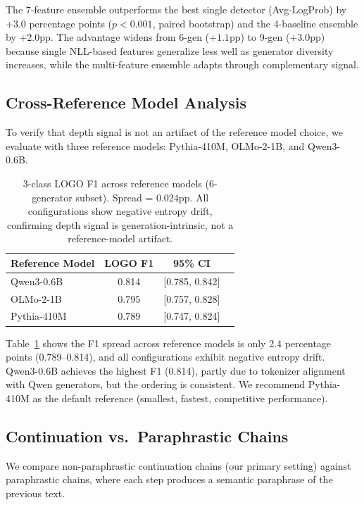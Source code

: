 \documentclass[11pt,a4paper]{article}
\begin{document}
The 7-feature ensemble outperforms the best single detector (Avg-LogProb) by +3.0 percentage points ($p < 0.001$, paired bootstrap) and the 4-baseline ensemble by +2.0pp. The advantage widens from 6-gen ($+1.1$pp) to 9-gen ($+3.0$pp) because single NLL-based features generalize less well as generator diversity increases, while the multi-feature ensemble adapts through complementary signal.

\subsection{Cross-Reference Model Analysis}
\label{sec:crossref}

To verify that depth signal is not an artifact of the reference model choice, we evaluate with three reference models: Pythia-410M, OLMo-2-1B, and Qwen3-0.6B.

\begin{table}[t]
\centering
\small
\begin{tabular}{lccc}
\toprule
\textbf{Reference Model} & \textbf{LOGO F1} & \textbf{95\% CI} \\
\midrule
Qwen3-0.6B    & 0.814 & [0.785, 0.842] \\
OLMo-2-1B     & 0.795 & [0.757, 0.828] \\
Pythia-410M    & 0.789 & [0.747, 0.824] \\
\bottomrule
\end{tabular}
\caption{3-class LOGO F1 across reference models (6-generator subset). Spread = 0.024pp. All configurations show negative entropy drift, confirming depth signal is generation-intrinsic, not a reference-model artifact.}
\label{tab:crossref}
\end{table}

Table~\ref{tab:crossref} shows the F1 spread across reference models is only 2.4 percentage points (0.789--0.814), and all configurations exhibit negative entropy drift. Qwen3-0.6B achieves the highest F1 (0.814), partly due to tokenizer alignment with Qwen generators, but the ordering is consistent. We recommend Pythia-410M as the default reference (smallest, fastest, competitive performance).

\subsection{Continuation vs.\ Paraphrastic Chains}
\label{sec:paraphrastic}

We compare non-paraphrastic continuation chains (our primary setting) against paraphrastic chains, where each step produces a semantic paraphrase of the previous text.
\end{document}
